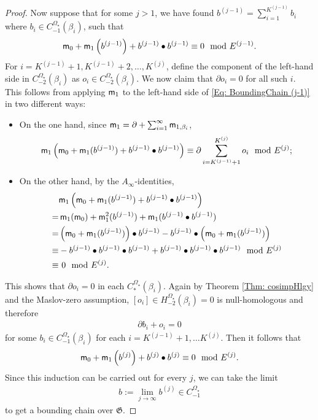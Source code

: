 \documentclass[10pt]{amsart}
\numberwithin{equation}{section}
\theoremstyle{plain}
\theoremstyle{definition}
\theoremstyle{remark}
\numberwithin{equation}{section}
\newcommand{\mf}[1]{\mathfrak{#1}}
\newcommand{\CBa}{C_*^{\Omega_\star}}
\newcommand{\Cba}[1]{C_{#1}^{\Omega_\star}}
\newcommand{\Hba}[1]{H_{#1}^{\Omega_\star}}
\newcommand{\mm}{\textup{\textsf{m}}}
\begin{document}
{\begin{proof}
	Now suppose that for some $j>1$, we have found $b^{(j-1)}= \sum_{i=1}^{K^{(j-1)}} b_i$ where $b_i\in \Cba{-1}(\beta_i)$, such that 
	\begin{align}\label{Eq: BoundingChain (j-1)}
		\mm_0 + \mm_1\left(b^{(j-1)}\right) + b^{(j-1)}\bullet b^{(j-1)} \equiv 0 \mod E^{(j-1)}.
	\end{align}
	For $i=K^{(j-1)}+1,K^{(j-1)}+2, \dots , K^{(j)}$, define the component of the left-hand side in $\Cba{-2}(\beta_i)$ as $o_i\in \Cba{-2}(\beta_i)$.
	We now claim that $\partial o_i=0$ for all such $i$. This follows from applying $\mm_1$ to the left-hand side of \eqref{Eq: BoundingChain (j-1)} in two different ways:
	\begin{itemize}
		\item On the one hand, since $\mm_1= \partial + \sum_{i=1}^\infty \mm_{1,\beta_i}$,\begin{align*}
			\mm_1\left(\mm_0 + \mm_1(b^{(j-1)}) + b^{(j-1)}\bullet b^{(j-1)}\right) \equiv \partial \sum_{i=K^{(j-1)}+1}^{K^{(j)}} o_i \mod E^{(j)};
		\end{align*}
		\item On the other hand, by the $A_\infty$-identities,
		\begin{align*}
			&\mm_1\left(\mm_0 + \mm_1(b^{(j-1)}) + b^{(j-1)}\bullet b^{(j-1)}\right)\\=& \, \mm_1(\mm_0) + \mm_1^2(b^{(j-1)}) + \mm_1(b^{(j-1)}\bullet b^{(j-1)}) \\
			= & \left( \mm_0+\mm_1(b^{(j-1)}) \right)\bullet b^{(j-1)} - b^{(j-1)} \bullet \left( \mm_0+\mm_1(b^{(j-1)}) \right)\\
			\equiv & - b^{(j-1)}\bullet b^{(j-1)}\bullet b^{(j-1)} + b^{(j-1)} \bullet b^{(j-1)}\bullet b^{(j-1)}\mod E^{(j)}\\
			\equiv & \,\, 0 \mod E^{(j)}.
		\end{align*}
	\end{itemize}
	This shows that $\partial o_i=0$ in each $\CBa(\beta_i)$. Again by Theorem \ref{Thm: cosimpHlgy} and the Maslov-zero assumption, $[o_i]\in \Hba{-2}(\beta_i)=0$ is null-homologous and therefore \begin{align*}
		\partial b_i + o_i =0
	\end{align*}
	for some $b_i\in \Cba{-1}(\beta_i)$ for each $i=K^{(j-1)}+1,\dots K^{(j)}$. Then it follows that \begin{align*}
\mm_0 + \mm_1\left(b^{(j)}\right) + b^{(j)}\bullet b^{(j)} \equiv 0 \mod E^{(j)}.	\end{align*}
Since this induction can be carried out for every $j$, we can take the limit
\begin{align*}
	b:= \lim_{j\to\infty}b^{(j)} \in \Cba{-1}
\end{align*}
to get a bounding chain over $\mf{G}$.
\end{proof}

}
\end{document}
